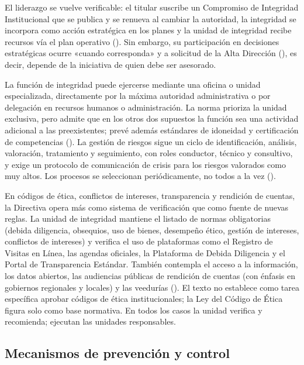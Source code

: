 \documentclass[Afour,sageh,times]{sagej}
\begin{document}
El liderazgo se vuelve verificable: el titular suscribe un Compromiso de Integridad Institucional que se publica y se renueva al cambiar la autoridad, la integridad se incorpora como acción estratégica en los planes y la unidad de integridad recibe recursos vía el plan operativo (\citealp{pcm2026directiva}). Sin embargo, su participación en decisiones estratégicas ocurre «cuando corresponda» y a solicitud de la Alta Dirección (\citealp{pcm2026directiva}), es decir, depende de la iniciativa de quien debe ser asesorado.

La función de integridad puede ejercerse mediante una oficina o unidad especializada, directamente por la máxima autoridad administrativa o por delegación en recursos humanos o administración. La norma prioriza la unidad exclusiva, pero admite que en los otros dos supuestos la función sea una actividad adicional a las preexistentes; prevé además estándares de idoneidad y certificación de competencias (\citealp{pcm2026directiva}). La gestión de riesgos sigue un ciclo de identificación, análisis, valoración, tratamiento y seguimiento, con roles conductor, técnico y consultivo, y exige un protocolo de comunicación de crisis para los riesgos valorados como muy altos. Los procesos se seleccionan periódicamente, no todos a la vez (\citealp{pcm2026directiva}).

En códigos de ética, conflictos de intereses, transparencia y rendición de cuentas, la Directiva opera más como sistema de verificación que como fuente de nuevas reglas. La unidad de integridad mantiene el listado de normas obligatorias (debida diligencia, obsequios, uso de bienes, desempeño ético, gestión de intereses, conflictos de intereses) y verifica el uso de plataformas como el Registro de Visitas en Línea, las agendas oficiales, la Plataforma de Debida Diligencia y el Portal de Transparencia Estándar. También contempla el acceso a la información, los datos abiertos, las audiencias públicas de rendición de cuentas (con énfasis en gobiernos regionales y locales) y las veedurías (\citealp{pcm2026directiva}). El texto no establece como tarea específica aprobar códigos de ética institucionales; la Ley del Código de Ética figura solo como base normativa. En todos los casos la unidad verifica y recomienda; ejecutan las unidades responsables.

\subsection{Mecanismos de prevención y control}
\label{subsec:mecanismos-prevencion-control}
\end{document}

